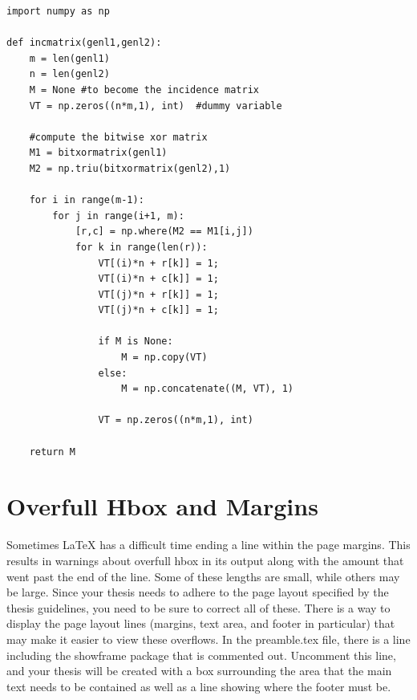     \begin{lstlisting}[float=hb, caption=Example from Overleaf demonstrating python code using a monospaced font. The use of this font is important to see what statement the return lines up with., label=lst:OverleafCode]
import numpy as np

def incmatrix(genl1,genl2):
    m = len(genl1)
    n = len(genl2)
    M = None #to become the incidence matrix
    VT = np.zeros((n*m,1), int)  #dummy variable

    #compute the bitwise xor matrix
    M1 = bitxormatrix(genl1)
    M2 = np.triu(bitxormatrix(genl2),1)

    for i in range(m-1):
        for j in range(i+1, m):
            [r,c] = np.where(M2 == M1[i,j])
            for k in range(len(r)):
                VT[(i)*n + r[k]] = 1;
                VT[(i)*n + c[k]] = 1;
                VT[(j)*n + r[k]] = 1;
                VT[(j)*n + c[k]] = 1;

                if M is None:
                    M = np.copy(VT)
                else:
                    M = np.concatenate((M, VT), 1)

                VT = np.zeros((n*m,1), int)

    return M
    \end{lstlisting}

\section{Overfull Hbox and Margins}
    Sometimes LaTeX has a difficult time ending a line within the page margins.
    This results in warnings about overfull hbox in its output along with the amount that went past the end of the line.
    Some of these lengths are small, while others may be large.
    Since your thesis needs to adhere to the page layout specified by the thesis guidelines, you need to be sure to correct all of these.
    There is a way to display the page layout lines (margins, text area, and footer in particular) that may make it easier to view these overflows.
    In the preamble.tex file, there is a line including the showframe package that is commented out.
    Uncomment this line, and your thesis will be created with a box surrounding the area that the main text needs to be contained as well as a line showing where the footer must be.


